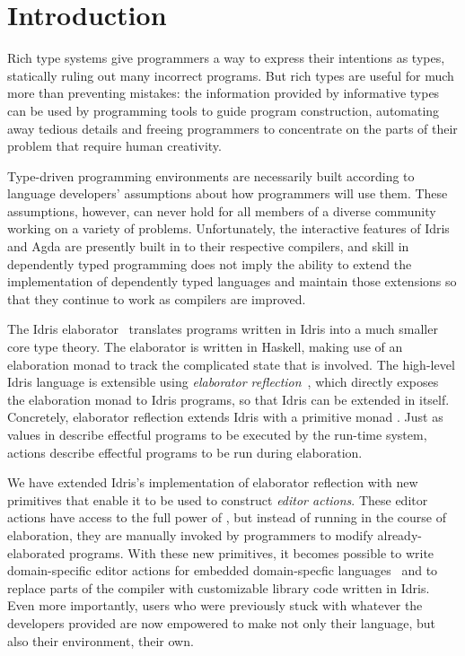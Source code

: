 \section{Introduction} \label{sec:introduction}

Rich type systems give programmers a way to express their intentions
as types, statically ruling out many incorrect programs. But rich
types are useful for much more than preventing mistakes: the
information provided by informative types can be used by programming
tools to guide program construction, automating away tedious details
and freeing programmers to concentrate on the parts of their
problem that require human creativity.

Type-driven programming environments are necessarily built according
to language developers' assumptions about how programmers will use
them. These assumptions, however, can never hold for all members of a
diverse community working on a variety of problems. Unfortunately, the
interactive features of Idris and Agda are presently built in to their
respective compilers, and skill in dependently typed programming does
not imply the ability to extend the implementation of dependently
typed languages and maintain those extensions so that they continue to
work as compilers are improved.

The Idris elaborator~\citep{idris} translates programs written in
Idris into a much smaller core type theory. The elaborator is written
in Haskell, making use of an elaboration monad to track the
complicated state that is involved. The high-level Idris language is
extensible using \emph{elaborator reflection}~\citep{davidphd,
  elabref}, which directly exposes the elaboration monad to Idris
programs, so that Idris can be extended in itself. Concretely,
elaborator reflection extends Idris with a primitive monad
\Elab{}. Just as values in \IO{} describe effectful programs to be
executed by the run-time system, \Elab{} actions describe effectful
programs to be run during elaboration.

We have extended Idris's implementation of elaborator reflection with
new primitives that enable it to be used to construct \emph{editor
  actions}. These editor actions have access to the full power of
\Elab{}, but instead of running in the course of elaboration, they are
manually invoked by programmers to modify already-elaborated programs.
With these new primitives, it becomes possible to write
domain-specific editor actions for embedded domain-specfic
languages~\citep{dsel} and to replace parts of the compiler with
customizable library code written in Idris. Even more importantly,
users who were previously stuck with whatever the developers provided
are now empowered to make not only their language, but also their
environment, their own.


